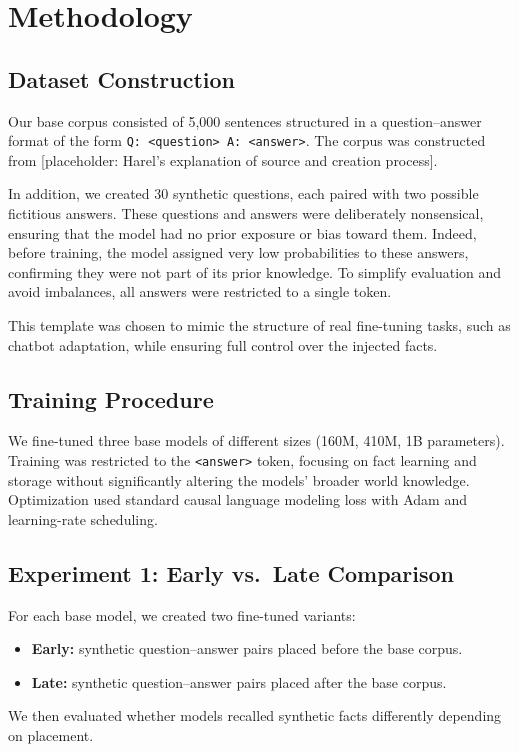 \documentclass[11pt]{article}
\begin{document}
    \section{Methodology}

    \subsection{Dataset Construction}
    Our base corpus consisted of 5{,}000 sentences structured in a question–answer format of the form \texttt{Q: <question> A: <answer>}. The corpus was constructed from [placeholder: Harel’s explanation of source and creation process].

    In addition, we created 30 synthetic questions, each paired with two possible fictitious answers. These questions and answers were deliberately nonsensical, ensuring that the model had no prior exposure or bias toward them. Indeed, before training, the model assigned very low probabilities to these answers, confirming they were not part of its prior knowledge. To simplify evaluation and avoid imbalances, all answers were restricted to a single token.

    This template was chosen to mimic the structure of real fine-tuning tasks, such as chatbot adaptation, while ensuring full control over the injected facts.

    \subsection{Training Procedure}
    We fine-tuned three base models of different sizes (160M, 410M, 1B parameters). Training was restricted to the \texttt{<answer>} token, focusing on fact learning and storage without significantly altering the models’ broader world knowledge. Optimization used standard causal language modeling loss with Adam and learning-rate scheduling.

    \subsection{Experiment 1: Early vs.\ Late Comparison}
    For each base model, we created two fine-tuned variants:
    \begin{itemize}
        \item \textbf{Early:} synthetic question–answer pairs placed before the base corpus.
        \item \textbf{Late:} synthetic question–answer pairs placed after the base corpus.
    \end{itemize}
    We then evaluated whether models recalled synthetic facts differently depending on placement.
\end{document}
